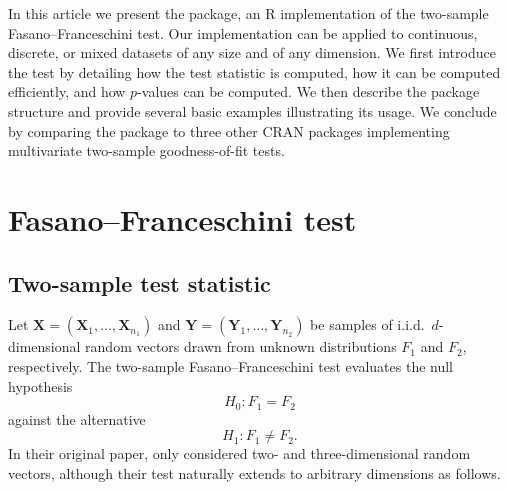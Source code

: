In this article we present the  package, an R implementation of the two-sample Fasano--Franceschini test. Our implementation can be applied to continuous, discrete, or mixed datasets of any size and of any dimension. We first introduce the test by detailing how the test statistic is computed, how it can be computed efficiently, and how $p$-values can be computed. We then describe the package structure and provide several basic examples illustrating its usage. We conclude by comparing the package to three other CRAN packages implementing multivariate two-sample goodness-of-fit tests.


\section{Fasano--Franceschini test}
\subsection{Two-sample test statistic}
Let $\mathbf{X}=(\mathbf{X}_{1},\dots,\mathbf{X}_{n_{1}})$ and $\mathbf{Y}=(\mathbf{Y}_{1},\dots,\mathbf{Y}_{n_{2}})$ be samples of i.i.d.\ $d$-dimensional random vectors drawn from unknown distributions $F_{1}$ and $F_{2}$, respectively. The two-sample Fasano--Franceschini test evaluates the null hypothesis
\begin{equation*}
H_{0}:F_{1}=F_{2}
\end{equation*}
against the alternative
\begin{equation*}
H_{1}:F_{1}\neq F_{2}.
\end{equation*}
In their original paper, \citet{ff1987} only considered two- and three-dimensional random vectors, although their test naturally extends to arbitrary dimensions as follows.

